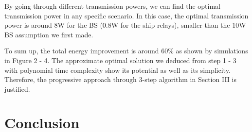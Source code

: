 \documentclass[conference]{IEEEtran}
\begin{document}
 By going through different transmission powers, we can find the optimal transmission power in any specific scenario. In this case, the optimal transmission power is around 8W for the BS (0.8W for the ship relays), smaller than the 10W BS assumption we first made. 
 
 
 
 
 To sum up, the total energy improvement is around 60\% as shown by simulations in Figure 2 - 4. The approximate optimal solution we deduced from step 1 - 3 with polynomial time complexity show its potential as well as its simplicity. Therefore, the progressive approach through 3-step algorithm in Section III is justified. 
 
 \section{Conclusion}\label{sec:5}
 
\end{document}
